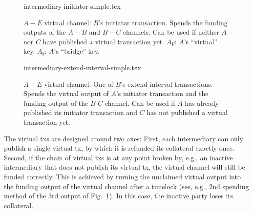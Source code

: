   \begin{figure}[!htbp]
    {intermediary-initiator-simple.tex}
    \caption{$A-E$ virtual channel: $B$'s initiator transaction. Spends the
    funding outputs of the $A-B$ and $B-C$ channels. Can be used if neither
    $A$ nor $C$ have published a virtual transaction yet. $A_V$: $A$'s
    ``virtual'' key. $A_b$: $A$'s ``bridge'' key.}
    \label{figure:virtual-layer-initiator-simple}
  \end{figure}

  \begin{figure}[!htbp]
    {intermediary-extend-interval-simple.tex}
    \caption{$A-E$ virtual channel: One of $B$'s extend interval
    transactions. Spends the virtual output of $A$'s
    initiator transaction and the funding output of the $B$-$C$ channel. Can be
    used if $A$ has already published its initiator transaction and $C$ has not
    published a virtual transaction yet.}
    \label{figure:virtual-layer-extend-interval-simple}
  \end{figure}

  The virtual txs are designed around two axes: First, each intermediary can
  only publish a single virtual tx, by which it is refunded its collateral
  exactly once. Second, if the chain of virtual txs is at any point broken by,
  e.g., an inactive intermediary that does not publish its virtual tx, the
  virtual channel will still be funded correctly. This is achieved by turning
  the unclaimed virtual output into the funding output of the virtual channel
  after a timelock (see, e.g., $2$nd spending method of the $3$rd output of
  Fig.~\ref{figure:virtual-layer-initiator-simple}). In this case, the inactive party loses its collateral.

